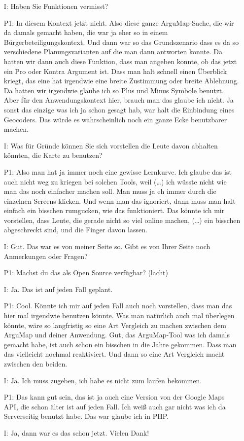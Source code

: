 \begin{itemize}
    \item[I:] Haben Sie Funktionen vermisst?
    \item[P1:] In diesem Kontext jetzt nicht. Also diese ganze ArguMap-Sache, die wir da damals gemacht haben, die war ja eher so in einem Bürgerbeteiligungskontext. Und dann war so das Grundszenario dass es da so verschiedene Planungsvarianten auf die man dann antworten konnte. Da hatten wir dann auch diese Funktion, dass man angeben konnte, ob das jetzt ein Pro oder Kontra Argument ist. Dass man halt schnell einen Überblick kriegt, das eine hat irgendwie eine breite Zustimmung oder breite Ablehnung. Da hatten wir irgendwie glaube ich so Plus und Minus Symbole benutzt. Aber für den Anwendungskontext hier, brauch man das glaube ich nicht. Ja sonst das einzige was ich ja schon gesagt hab, war halt die Einbindung eines Geocoders. Das würde es wahrscheinlich noch ein ganze Ecke benutzbarer machen.
    \item[I:] Was f{\"u}r Gr{\"u}nde k{\"o}nnen Sie sich vorstellen die Leute davon abhalten k{\"o}nnten, die Karte zu benutzen?
    \item[P1:] Also man hat ja immer noch eine gewisse Lernkurve. Ich glaube das ist auch nicht weg zu kriegen bei solchen Tools, weil (\dots) ich wüsste nicht wie man das noch einfacher machen soll. Man muss ja eh immer durch die einzelnen Screens klicken. Und wenn man das ignoriert, dann muss man halt einfach ein bisschen rumgucken, wie das funktioniert. Das könnte ich mir vorstellen, dass Leute, die gerade nicht so viel online machen, (\dots) ein bisschen abgeschreckt sind, und die Finger davon lassen.
    \item[I:] Gut. Das war es von meiner Seite so. Gibt es von Ihrer Seite noch Anmerkungen oder Fragen?
    \item[P1:] Machst du das als Open Source verfügbar? (lacht)
    \item[I:] Ja. Das ist auf jeden Fall geplant.
    \item[P1:] Cool. Könnte ich mir auf jeden Fall auch noch vorstellen, dass man das hier mal irgendwie benutzen könnte. Was man natürlich auch mal überlegen könnte, wäre so langfristig so eine Art Vergleich zu machen zwischen dem ArguMap und deiner Anwendung. Gut, das ArguMap-Tool was ich damals gemacht habe, ist auch schon ein bisschen in die Jahre gekommen. Dass man das vielleicht nochmal reaktiviert. Und dann so eine Art Vergleich macht zwischen den beiden.
    \item[I:] Ja. Ich muss zugeben, ich habe es nicht zum laufen bekommen.
    \item[P1:] Das kann gut sein, das ist ja auch eine Version von der Google Maps API, die schon älter ist auf jeden Fall. Ich weiß auch gar nicht was ich da Serverseitig benutzt habe. Das war glaube ich in PHP.
    \item[I:] Ja, dann war es das schon jetzt. Vielen Dank!        
\end{itemize}